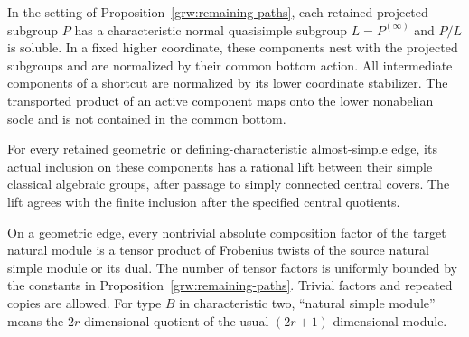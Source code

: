 \begin{proposition}
\label{lift:edge-lifts}
In the setting of Proposition~\ref{grw:remaining-paths}, each retained
projected subgroup $P$ has a characteristic normal quasisimple subgroup
$L=P^{(\infty)}$ and $P/L$ is soluble.  In a fixed higher coordinate,
these components nest with the projected subgroups and are normalized
by their common bottom action.  All intermediate components of a
shortcut are normalized by its lower coordinate stabilizer.  The
transported product of an active component maps onto the lower
nonabelian socle and is not contained in the common bottom.

For every retained geometric or defining-characteristic almost-simple
edge, its actual inclusion on these components has a rational lift
between their simple classical algebraic groups, after passage to
simply connected central covers.  The lift agrees with the finite
inclusion after the specified central quotients.

On a geometric edge, every nontrivial absolute composition factor of
the target natural module is a tensor product of Frobenius twists of
the source natural simple module or its dual.  The number of tensor
factors is uniformly bounded by the constants in
Proposition~\ref{grw:remaining-paths}.  Trivial factors and repeated
copies are allowed.  For type $B$ in characteristic two, ``natural
simple module'' means the $2r$-dimensional quotient of the usual
$(2r+1)$-dimensional module.
\end{proposition}

